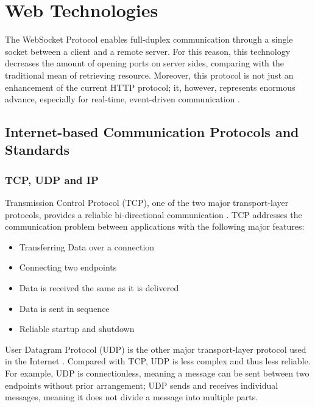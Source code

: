 \chapter{Web Technologies}
\label{chapter:WebTechnologies} 

The WebSocket Protocol enables full-duplex communication through a single socket between a client and a remote server. For this reason, this technology decreases the amount of opening ports on server sides, comparing with the traditional mean of retrieving resource. Moreover, this protocol is not just an enhancement of the current HTTP protocol; it, however, represents enormous advance, especially for real-time, event-driven communication \cite{lubbers2010html5}.

\section{Internet-based Communication Protocols and Standards}

\subsection{TCP, UDP and IP}
Transmission Control Protocol (TCP), one of the two major transport-layer protocols, provides a reliable bi-directional communication \cite{comer2008computer}. TCP addresses the communication problem between applications with the following major features: 

\begin{itemize}
\setlength{\itemsep}{0pt}
\item Transferring Data over a connection 
\item Connecting two endpoints
\item Data is received the same as it is delivered
\item Data is sent in sequence
\item Reliable startup and shutdown
\end{itemize}

User Datagram Protocol (UDP) is the other major transport-layer protocol used in the Internet \cite{comer2008computer}. Compared with TCP, UDP is less complex and thus less reliable. For example, UDP is connectionless, meaning a message can be sent between two endpoints without prior arrangement; UDP sends and receives individual messages, meaning it does not divide a message into multiple parts.

